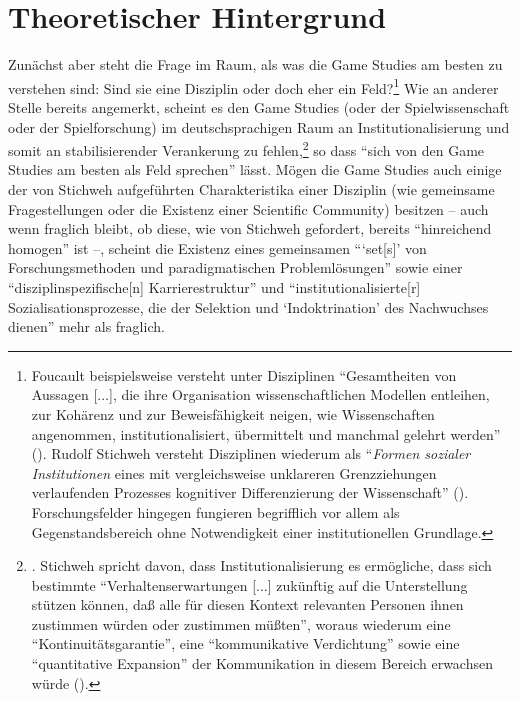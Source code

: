\documentclass{scrartcl}
\begin{document}
\section{Theoretischer Hintergrund}\label{sec:hintergrund}
Zunächst aber steht die Frage im Raum, als was die Game Studies am besten zu verstehen sind:
Sind sie eine Disziplin oder doch eher ein Feld?\footnote{Foucault beispielsweise versteht unter Disziplinen \enquote{Gesamtheiten von Aussagen [$\ldots$], die ihre Organisation wissenschaftlichen Modellen entleihen, zur Kohärenz und zur Beweisfähigkeit neigen, wie Wissenschaften angenommen, institutionalisiert, übermittelt und manchmal gelehrt werden} (\autocite[][S.~253--254]{foucault_archaologie_2011}). Rudolf Stichweh versteht Disziplinen wiederum als \enquote{\textit{Formen sozialer Institutionen} eines mit vergleichsweise unklareren Grenzziehungen verlaufenden Prozesses kognitiver Differenzierung der Wissenschaft} (\autocite[][S.~17]{stichweh_wissenschaft_2013}). Forschungsfelder hingegen fungieren begrifflich vor allem als Gegenstandsbereich ohne Notwendigkeit einer institutionellen Grundlage.}
Wie an anderer Stelle bereits angemerkt, scheint es den Game Studies (oder der Spielwissenschaft oder der Spielforschung) im deutschsprachigen Raum an Institutionalisierung und somit an stabilisierender Verankerung zu fehlen,\footnote{\autocite[Vgl.][S.~10]{stichweh_ausdifferenzierung_1981}. Stichweh spricht davon, dass Institutionalisierung es ermögliche, dass sich bestimmte \enquote{Verhaltenserwartungen [$\ldots$] zukünftig auf die Unterstellung stützen können, daß alle für diesen Kontext relevanten Personen ihnen zustimmen würden oder zustimmen müßten}, woraus wiederum eine \enquote{Kontinuitätsgarantie}, eine \enquote{kommunikative Verdichtung} sowie eine \enquote{quantitative Expansion} der Kommunikation in diesem Bereich erwachsen würde (\autocite[][S.~10]{stichweh_ausdifferenzierung_1981}).} so dass \enquote{sich von den Game Studies am besten als Feld sprechen} lässt.\autocite[][S.~26]{unterhuber_wer_2024}
Mögen die Game Studies auch einige der von Stichweh aufgeführten Charakteristika einer Disziplin (wie gemeinsame Fragestellungen oder die Existenz einer Scientific Community) besitzen -- auch wenn fraglich bleibt, ob diese, wie von Stichweh gefordert, bereits \enquote{hinreichend homogen} ist --, scheint die Existenz eines gemeinsamen \enquote{\enquote{set[s]} von Forschungsmethoden und paradigmatischen Problemlösungen} sowie einer \enquote{disziplinspezifische[n] Karrierestruktur} und \enquote{institutionalisierte[r] Sozialisationsprozesse, die der Selektion und \enquote{Indoktrination} des Nachwuchses dienen} mehr als fraglich.\autocite[][S.~17]{stichweh_wissenschaft_2013}
\end{document}
